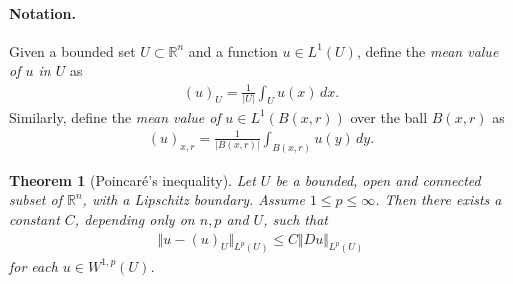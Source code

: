 \documentclass{article}
\numberwithin{equation}{section}
\newcommand{\bbR}{\mathbb{R}}
\theoremstyle{plain}
\newtheorem{theorem}{Theorem}[section]
\theoremstyle{definition}
\begin{document}
\paragraph{Notation.} Given a bounded set $U\subset\bbR^n$ and a function $u\in L^1(U)$, define the \textit{mean value of $u$ in $U$} as
\begin{align*}
	(u)_U=\frac{1}{\vert U\vert}\int_U u(x)\,dx.
\end{align*}
Similarly, define the \textit{mean value of} $u\in L^1(B(x,r))$ over the ball $B(x,r)$ as
\begin{align*}
	(u)_{x,r}=\frac{1}{\vert B(x,r)\vert}\int_{B(x,r)} u(y)\,dy.
\end{align*}
\begin{theorem}[Poincaré's inequality]\label{poincaregeneral}
Let $U$ be a bounded, open and connected subset of $\bbR^n$, with a Lipschitz boundary. Assume $1\leq p\leq\infty$. Then there exists a constant $C$, depending only on $n,p$ and $U$, such that
\begin{align*}
	\Vert u-(u)_U\Vert_{L^p(U)}\leq C\Vert Du\Vert_{L^p(U)}
\end{align*}
for each $u\in W^{1,p}(U)$.
\end{theorem}
\end{document}
